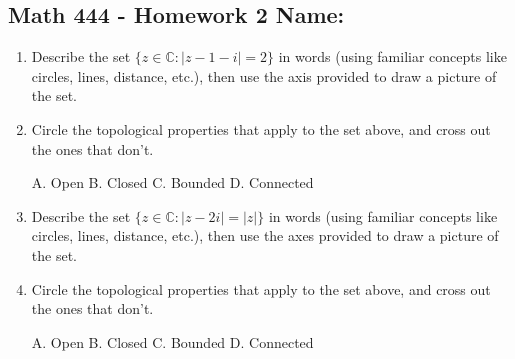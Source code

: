 \documentclass[11pt]{article}
\newcommand{\C}{\mathbb{C}}
\begin{document}
\pagestyle{empty}
\subsection*{Math 444 - Homework 2 \hfill Name: \underline{\hspace*{2in}}}
\begin{enumerate}
\item Describe the set $\{z\in \C : | z - 1 - i| = 2\}$ in words (using familiar concepts like circles, lines, distance, etc.), then use the axis provided to draw a picture of the set.
\begin{flushright}
\end{flushright}

\item Circle the topological properties that apply to the set above, and cross out the ones that don't.
\begin{center}
A. Open \hspace*{0.4in} B. Closed \hspace*{0.4in} C. Bounded \hspace*{0.4in} D. Connected
\end{center}
\vspace*{0.15in}

\item Describe the set $\{z \in \C : | z - 2i | = |z| \}$ in words (using familiar concepts like circles, lines, distance, etc.), then use the axes provided to draw a picture of the set.  \\
\begin{flushright}
\end{flushright}


\item Circle the topological properties that apply to the set above, and cross out the ones that don't.
\begin{center}
A. Open \hspace*{0.4in} B. Closed \hspace*{0.4in} C. Bounded \hspace*{0.4in} D. Connected
\end{center}
\vspace*{0.15in}



\end{enumerate}
\end{document}

